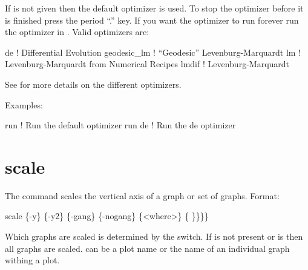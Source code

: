 \vskip 0.2in 

If  is not given then the default optimizer is
used. To stop the optimizer before it is finished press the period
``.''  key. If you want the optimizer to run forever run the optimizer
in . Valid optimizers are:
\begin{example}
  de            ! Differential Evolution
  geodesic_lm   ! ``Geodesic'' Levenburg-Marquardt 
  lm            ! Levenburg-Marquardt from Numerical Recipes 
  lmdif         ! Levenburg-Marquardt 
\end{example}
See  for more details on the different
optimizers.

Examples:
\begin{example}
  run         ! Run the default optimizer
  run de      ! Run the de optimizer
\end{example}

\section{scale}
\label{s:scale}

The  command scales the vertical axis of a graph or set of graphs.
Format:
\begin{example}
  scale \{-y\} \{-y2\} \{-gang\} \{-nogang\} \{<where>\} \{<value1> \}<value2>\}\}\}
\end{example}

Which graphs are scaled is determined by the  switch. If
 is not present or  is  then all
graphs are scaled.  can be a plot name or the name of an
individual graph withing a plot.

\vskip 0.2in 

